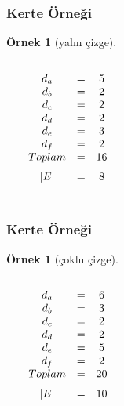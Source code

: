 \documentclass[dvipsnames]{beamer}
\theoremstyle{definition}
\theoremstyle{example}
\newtheorem{ornek}[theorem]{Örnek}
\theoremstyle{plain}
\begin{document}
\begin{frame}
  \frametitle{Kerte Örneği}

  \begin{ornek}[yalın çizge]
    \begin{columns}
      \begin{center}
      \end{center}

      $\begin{array}{ccc}
      d_a & = & 5\\
      d_b & = & 2\\
      d_c & = & 2\\
      d_d & = & 2\\
      d_e & = & 3\\
      d_f & = & 2\\
      \medskip
      Toplam & = & 16\\
      \medskip
      |E| & = & 8
      \end{array}$
    \end{columns}
  \end{ornek}
\end{frame}

\begin{frame}
  \frametitle{Kerte Örneği}

  \begin{ornek}[çoklu çizge]
    \begin{columns}
      \begin{center}
      \end{center}

      $\begin{array}{ccc}
      d_a & = & 6\\
      d_b & = & 3\\
      d_c & = & 2\\
      d_d & = & 2\\
      d_e & = & 5\\
      d_f & = & 2\\
      \medskip
      Toplam & = & 20\\
      \medskip
      |E| & = & 10
      \end{array}$
    \end{columns}
  \end{ornek}
\end{frame}
\end{document}
